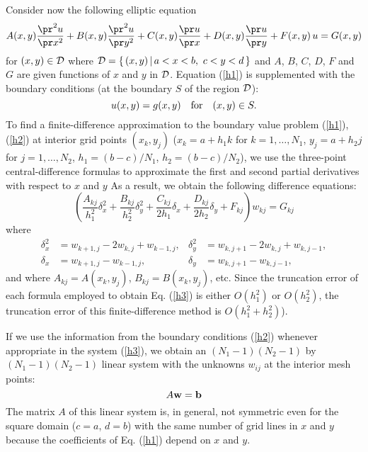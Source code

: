 Consider now the following elliptic equation
\begin{equation}
A(x,y)\frac{\pr^2 u}{\pr x^2}+B(x,y)\frac{\pr^2 u}{\pr y^2}+
C(x,y)\frac{\pr u}{\pr x}+D(x,y)\frac{\pr u}{\pr y}+F(x,y) \, u = G(x,y)
\label{h1}
\end{equation}
for $(x,y)\in{\cal D}$ where ${\cal D}=\{\, (x,y)\, \vert \,  a<x<b, \ c<y<d \, \}$ and
$A$, $B$, $C$, $D$, $F$ and $G$ are given functions of $x$ and $y$ in ${\cal D}$.
Equation (\ref{h1}) is supplemented with
the boundary conditions (at the boundary $S$ of the region ${\cal D}$):
\begin{equation}
u(x,y) = g(x,y) \quad \hbox{for} \quad (x,y)\in S.   \label{h2}
\end{equation}
To find a finite-difference approximation to the boundary value problem
(\ref{h1}), (\ref{h2}) at interior grid points $(x_{k},y_{j})$ ($x_{k}=a+h_{1}k$ for
$k=1,\dots,N_{1}$, $y_{j}=a+h_{2}j$ for
$j=1,\dots,N_{2}$, $h_{1}=(b-c)/N_{1}$, $h_{2}=(b-c)/N_{2}$), we use
the three-point central-difference formulas
to approximate the first and second partial derivatives with respect to $x$ and $y$
As a result, we obtain the following
difference equations:
\begin{equation}
\left(\frac{A_{kj}}{h_{1}^2}\delta_{x}^2+
\frac{B_{kj}}{h_{2}^2}\delta_{y}^2+ \frac{C_{kj}}{2h_{1}}\delta_{x}+
\frac{D_{kj}}{2h_{2}}\delta_{y}+F_{kj}\right)w_{kj}=G_{kj} \label{h3}
\end{equation}
where
\begin{align*}
\delta_{x}^2&=w_{k+1,j}-2w_{k,j}+w_{k-1,j}, &
\delta_{y}^2&=w_{k,j+1}-2w_{k,j}+w_{k,j-1}, \\
\delta_{x}&=w_{k+1,j}-w_{k-1,j}, &
\delta_{y}&=w_{k,j+1}-w_{k,j-1},
\end{align*}
and where $A_{kj}=A(x_{k},y_{j})$, $B_{kj}=B(x_{k},y_{j})$, etc.
Since the truncation error of each formula employed to obtain Eq. (\ref{h3})
is either $O(h_{1}^{2})$ or $O(h_{2}^{2})$, the truncation error of
this finite-difference method is $O(h_{1}^{2}+h_{2}^{2})$).

\vskip 0.3cm
 
If we use the information from the boundary conditions (\ref{h2})
whenever appropriate in the system (\ref{h3}), we obtain an
$(N_{1}-1)(N_{2}-1)$ by $(N_{1}-1)(N_{2}-1)$ linear system with
the unknowns $w_{ij}$ at the interior mesh points:
\[
A{\bf w}={\bf b}
\]
The matrix $A$ of this linear system is, in general, not symmetric even for
the square domain ($c=a$, $d=b$) with the same number of grid lines in $x$ and
$y$ because the coefficients of Eq. (\ref{h1}) depend on $x$ and $y$.

